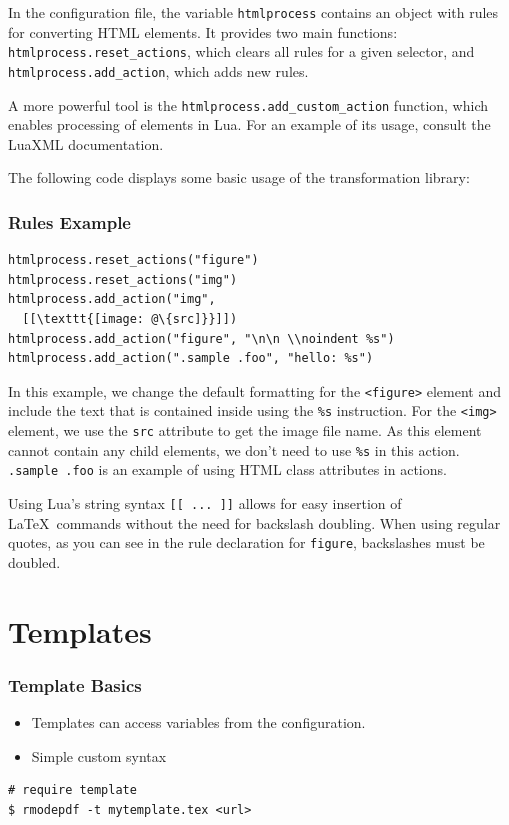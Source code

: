In the configuration file, the variable \texttt{htmlprocess} contains an object with
rules for converting HTML elements. It provides two main functions:
\texttt{htmlprocess.reset\_actions}, which clears all rules for a given selector, and
\texttt{htmlprocess.add\_action}, which adds new rules.

A more powerful tool is the \verb|htmlprocess.add_custom_action| function, which
enables processing of elements in Lua. For an example of its usage, consult the
LuaXML documentation.

The following code displays some basic usage of the transformation library:

\begin{frame}[fragile]
  \frametitle{Rules Example}

\begin{verbatim}
htmlprocess.reset_actions("figure")
htmlprocess.reset_actions("img")
htmlprocess.add_action("img",
  [[\texttt{[image: @\{src]}}]])
htmlprocess.add_action("figure", "\n\n \\noindent %s")
htmlprocess.add_action(".sample .foo", "hello: %s")
\end{verbatim}
\end{frame}

In this example, we change the default formatting for the \verb|<figure>| element and include the 
text that is contained inside using the \verb|%s| instruction. For the \verb|<img>| element, we use 
the \verb|src| attribute to get the image file name. As this element cannot contain any child elements,
we don't need to use \verb|%s| in this action. \verb|.sample .foo| is an example of using HTML class 
attributes in actions.

Using Lua's string syntax \verb|[[ ... ]]| allows for easy insertion of \LaTeX\
commands without the need for backslash doubling. When using regular quotes, as
you can see in the rule declaration for \verb|figure|, backslashes must be
doubled.

\section{Templates}

\begin{frame}[fragile]
  \frametitle{Template Basics}

\begin{itemize}
  \item Templates can access variables from the configuration.
  \item Simple custom syntax
\end{itemize}

\begin{verbatim}
# require template
$ rmodepdf -t mytemplate.tex <url>
\end{verbatim}
\end{frame}



